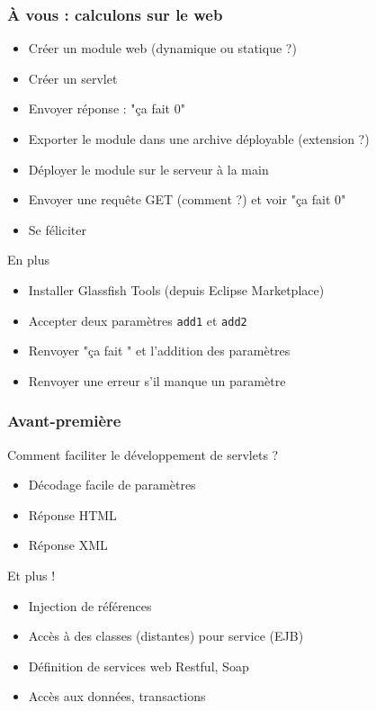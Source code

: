 \documentclass[english, french]{beamer}
\begin{document}
\begin{frame}
	\frametitle{À vous : calculons sur le web}
	\begin{itemize}
		\item Créer un module web (dynamique ou statique ?)
		\item Créer un servlet
		\item Envoyer réponse : "ça fait 0"
		\item Exporter le module dans une archive déployable (extension ?)
		\item Déployer le module sur le serveur à la main
		\item Envoyer une requête GET (comment ?) et voir "ça fait 0"
		\item Se féliciter
	\end{itemize}
	\begin{block}{En plus}
		\begin{itemize}
			\item Installer Glassfish Tools (depuis Eclipse Marketplace)
			\item Accepter deux paramètres \texttt{add1} et \texttt{add2}
			\item Renvoyer "ça fait " et l’addition des paramètres
			\item Renvoyer une erreur s’il manque un paramètre
		\end{itemize}
	\end{block}
\end{frame}

\begin{frame}
	\frametitle{Avant-première}
	Comment faciliter le développement de servlets ?\pause
	\begin{itemize}
		\item Décodage facile de paramètres
		\item Réponse HTML
		\item Réponse XML
	\end{itemize}
	\pause
	\begin{block}{Et plus !}
		\begin{itemize}
			\item Injection de références
			\item Accès à des classes (distantes) pour service (EJB)
			\item Définition de services web Restful, Soap
			\item Accès aux données, transactions
		\end{itemize}
	\end{block}
\end{frame}
\end{document}
